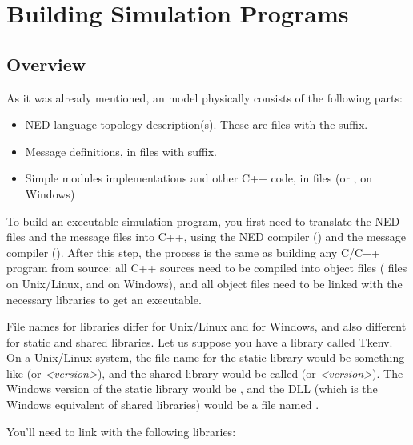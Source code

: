 \chapter{Building Simulation Programs}
\label{cha:building-simulation-programs}




\section{Overview}

As it was already mentioned, an {\opp} model physically consists of
the following parts:
\begin{itemize}
  \item{NED language topology description(s). These
      are files with the  suffix.}
  \item{Message definitions, in files
      with  suffix.}
  \item{Simple modules implementations and other C++ code, in 
        files (or , on Windows)}
\end{itemize}


To build an executable simulation program,
you first need to translate the NED files
and the message files into C++, using the NED compiler
() and the message compiler ().
After this step, the process is the same as building any C/C++
program from source: all C++ sources need to be compiled into object files
( files on Unix/Linux, and  on Windows),
and all object files need to be linked with the necessary libraries to get
an executable.


File names for libraries differ for Unix/Linux and for Windows,
and also different for static and shared libraries.
Let us suppose you have a library called Tkenv.
On a Unix/Linux system, the file name for the static library
would be something like  (or \textit{<version>}),
and the shared library would be called 
(or \textit{<version>}).
The Windows version of the static library would be ,
and the DLL (which is the Windows equivalent of shared libraries)
would be a file named .

You'll need to link with the following libraries:

